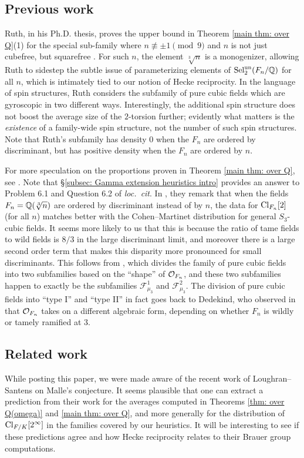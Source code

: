 \documentclass[11pt,a4paper]{amsart}
\def\Q{{\rm \mathbb{Q}}}
\def\O{{\rm \mathcal{O}}}
\def\un{{\rm un}}
\def\Cl{{\rm Cl}}
\def\Sel{{\rm Sel}}
\numberwithin{equation}{section}
\begin{document}
\subsection{Previous work}
Ruth, in his Ph.D. thesis, proves the upper bound in Theorem \ref{main thm: over Q}(1) for the special sub-family where $n \not\equiv \pm 1\pmod{9}$ and $n$ is not just cubefree, but squarefree \cite[Theorem 1.1.5]{RuthThesis}. For such $n$, the element $\sqrt[3]{n}$ is a monogenizer, allowing Ruth to sidestep the subtle issue of parameterizing elements of $\Sel_2^\un(F_n/\Q)$ for all $n$, which is intimately tied to our notion of Hecke reciprocity.  In the language of spin structures, Ruth considers the subfamily of pure cubic fields which are gyroscopic in two different ways. Interestingly, the additional spin structure does not boost the average size of the $2$-torsion further; evidently what matters is the {\it existence} of a family-wide spin structure, not the number of such spin structures.  Note that Ruth's subfamily has density $0$ when the $F_n$ are ordered by discriminant, but has positive density when the $F_n$ are ordered by $n$. 

For more speculation on the proportions proven in Theorem \ref{main thm: over Q}, see \cite[\S4-6]{CohenMartinet94}. Note that \S\ref{subsec: Gamma extension heuristics intro} provides an answer to Problem 6.1 and Question 6.2 of {\it loc.\ cit}.  In \cite{CohenMartinet87}, they remark that when the fields $F_n = \Q(\sqrt[3]{n})$ are ordered by discriminant instead of by $n$, the data for $\Cl_{F_n}[2]$ (for all $n$) matches better with the Cohen--Martinet distribution for general $S_3$-cubic fields. It seems more likely to us that this is because the ratio of tame fields to wild fields is $8/3$ in the large discriminant limit,  and  moreover there is a large second order term that makes this disparity more pronounced for small discriminants. This follows from \cite[Theorem 8]{BhargavaShnidman14}, which divides the family of pure cubic fields into two subfamilies based on the ``shape'' of $\O_{F_n}$, and these two subfamilies happen to exactly be the subfamilies $\mathcal{F}_{\mu_3}^1$ and $\mathcal{F}_{\mu_3}^2$.  The division of pure cubic fields into ``type I'' and ``type II'' in fact goes back to Dedekind, who observed in \cite{Dedekind1900} that $\O_{F_n}$ takes on a different algebraic form, depending on whether $F_n$ is wildly or tamely ramified at $3$.



\subsection{Related work}
While posting this paper, we were made aware of the recent work of Loughran--Santens \cite{LoughranSantens} on Malle's conjecture. It seems plausible that one can extract a prediction from their work for the averages computed in Theorems \ref{thm: over Q(omega)} and \ref{main thm: over Q}, and more generally for the distribution of $\Cl_{F/K}[2^\infty]$ in the families covered by our heuristics. It will be interesting to see if these predictions agree and how Hecke reciprocity relates to their Brauer group computations.
\end{document}
